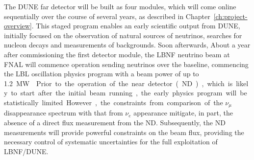 The DUNE far detector will be built as four  modules, which will
come online sequentially over the course of several years, as described in Chapter~\ref{ch:project-overview}. 
This staged program enables an early scientific output from DUNE, 
initially focused on the observation of natural
sources of neutrinos, searches for nucleon decays and 
measurements of backgrounds. Soon afterwards, 
About a year after commissioning the first detector module,  the LBNF neutrino
beam at FNAL will commence operation sending neutrinos over the 
baseline, commencing the LBL oscillation physics program with a beam power of up to \SI{1.2}\MW{}. 
Prior to the operation of the near detector (ND), which
is likely to start after the initial beam running, the early physics program
will be statistically limited. However, the constraints from comparison of the $\nu_\mu$
disappearance spectrum with that from $\nu_e$ appearance mitigate, in part,
the absence of a direct flux measurement from the ND. Subsequently, the ND
measurements will provide powerful constraints on the beam flux, providing the
necessary control of systematic uncertainties for the full exploitation of LBNF/DUNE. 


